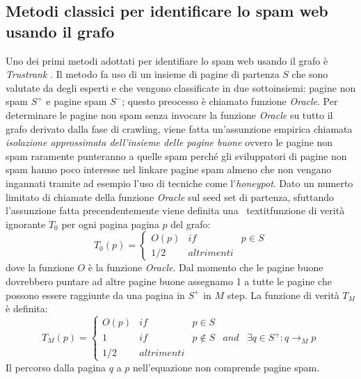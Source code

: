 \subsection{Metodi classici per identificare lo spam web usando il grafo}
Uno dei primi metodi adottati per identifiare lo spam web usando il grafo è \textit{Trustrank} \cite{Gyongyi:2004:CWS:1316689.1316740}. Il metodo fa uso di un insieme di pagine di partenza \(S\) che sono valutate da degli esperti e che vengono classificate in due sottoinsiemi: pagine non spam \(S^+\) e pagine spam \(S^-\); questo preocesso è chiamato funzione \textit{Oracle}. Per determinare le pagine non spam senza invocare la funzione \textit{Oracle} su tutto il grafo derivato dalla fase di crawling, viene fatta un'assunzione empirica chiamata \textit{isolazione approssimata dell'insieme delle pagine buone} ovvero le pagine non spam raramente punteranno a quelle spam perché gli sviluppatori di pagine non spam hanno poco interesse nel linkare pagine spam almeno che non vengano ingannati tramite ad esempio l'uso di tecniche come l'\textit{honeypot}. Dato un numerto limitato di chiamate della funzione \textit{Oracle} sul seed set di partenza, sfuttando l'assunzione fatta precendentemente viene definita una \
textit{funzione di verità ignorante \(T_0\)} per ogni pagina pagina \(p\) del grafo:
\begin{equation}
T_0(p)=\left\{
\begin{array}{ccc}
O(p) & if & p\in S \\
1/2 & altrimenti
\end{array}
\right .
\end{equation}
dove la funzione \(O\) è la funzione \textit{Oracle}. Dal momento che le pagine buone dovrebbero puntare ad altre pagine buone assegnamo 1 a tutte le pagine che possono essere raggiunte da una pagina in \(S^+\) in \(M\) step. La funzione di verità \(T_M\) è definita:
\begin{equation}
T_M(p)=\left\{
\begin{array}{ccccc}
O(p) & if & p\in S \\
1 & if & p \not\in S & and & \exists q\in S^+:q\rightarrow_M p \\
1/2 & altrimenti
\end{array}
\right .
\end{equation}
Il percorso  dalla pagina \(q\) a \(p\) nell'equazione non comprende pagine spam.

